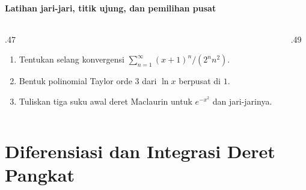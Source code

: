 \documentclass{../../kalkulus-ppt}
\begin{document}
\begin{frame}{\insertsection}
    \framesubtitle{Latihan jari-jari, titik ujung, dan pemilihan pusat}
    \begin{columns}[T,onlytextwidth]
        \begin{column}{.47\textwidth}
            \begin{latihan}
                \begin{enumerate}
                    \item Tentukan selang konvergensi
                        $\sum_{n=1}^\infty (x+1)^n/(2^n n^2)$.
                    \item Bentuk polinomial Taylor orde $3$
                        dari $\ln x$ berpusat di $1$.
                    \item Tuliskan tiga suku awal deret Maclaurin
                        untuk $e^{-x^2}$ dan jari-jarinya.
                \end{enumerate}
            \end{latihan}
        \end{column}
        \begin{column}{.49\textwidth}
        \end{column}
    \end{columns}
\end{frame}

\section{Diferensiasi dan Integrasi Deret Pangkat}
\end{document}
